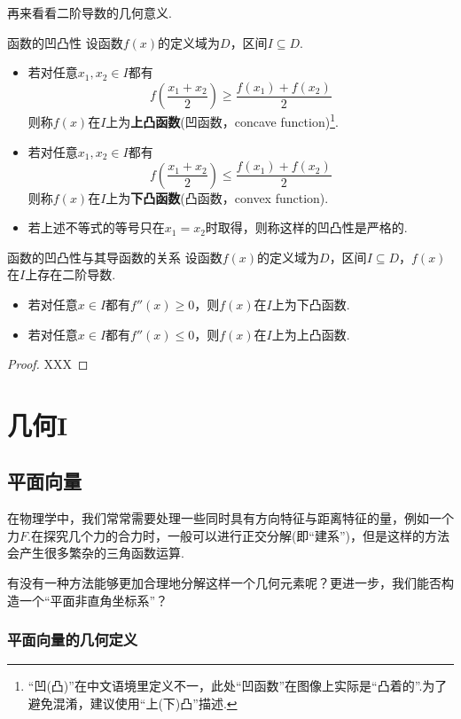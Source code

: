 \documentclass[lang=cn, zihao=5]{elegantbook}
\newcommand{\ssb}[1]{\left( #1 \right)}
\begin{document}
再来看看二阶导数的几何意义.

\begin{definition}{函数的凹凸性}
	设函数$f(x)$的定义域为$D$，区间$I \subseteq D$.
	\begin{itemize}
		\item 若对任意$x_1,x_2 \in I$都有$$f\ssb{\frac{x_1+x_2}{2}} \geq \frac{f(x_1)+f(x_2)}{2}$$则称$f(x)$在$I$上为\textbf{上凸函数}(凹函数，concave function)\footnote{“凹(凸)”在中文语境里定义不一，此处“凹函数”在图像上实际是“凸着的”.为了避免混淆，建议使用“上(下)凸”描述.}.
		\item 若对任意$x_1,x_2 \in I$都有$$f\ssb{\frac{x_1+x_2}{2}} \leq \frac{f(x_1)+f(x_2)}{2}$$则称$f(x)$在$I$上为\textbf{下凸函数}(凸函数，convex function).
		\item 若上述不等式的等号只在$x_1=x_2$时取得，则称这样的凹凸性是严格的.
	\end{itemize}
\end{definition}

\begin{theorem}{函数的凹凸性与其导函数的关系}
	设函数$f(x)$的定义域为$D$，区间$I \subseteq D$，$f(x)$在$I$上存在二阶导数.
	\begin{itemize}
		\item 若对任意$x \in I$都有$f''(x) \geq 0$，则$f(x)$在$I$上为下凸函数.
		\item 若对任意$x \in I$都有$f''(x) \leq 0$，则$f(x)$在$I$上为上凸函数.
	\end{itemize}
\end{theorem}
\begin{proof}
	XXX
\end{proof}

\part{几何I}

\chapter{平面向量}

在物理学中，我们常常需要处理一些同时具有方向特征与距离特征的量，例如一个力$F$.在探究几个力的合力时，一般可以进行正交分解(即“建系”)，但是这样的方法会产生很多繁杂的三角函数运算.

有没有一种方法能够更加合理地分解这样一个几何元素呢？更进一步，我们能否构造一个“平面非直角坐标系”？

\section{平面向量的几何定义}
\end{document}
